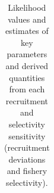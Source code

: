 \documentclass[
]{scrartcl}
\begin{document}
\newpage{}

\begin{landscape}
\begingroup
\fontsize{9.0pt}{10.8pt}\selectfont

\begin{longtable}{>{\raggedright\arraybackslash}p{\dimexpr 56.25pt -2\tabcolsep-1.5\arrayrulewidth}>{\raggedright\arraybackslash}p{\dimexpr 150.00pt -2\tabcolsep-1.5\arrayrulewidth}>{\raggedright\arraybackslash}p{\dimexpr 56.25pt -2\tabcolsep-1.5\arrayrulewidth}>{\raggedright\arraybackslash}p{\dimexpr 56.25pt -2\tabcolsep-1.5\arrayrulewidth}>{\raggedright\arraybackslash}p{\dimexpr 56.25pt -2\tabcolsep-1.5\arrayrulewidth}>{\raggedright\arraybackslash}p{\dimexpr 56.25pt -2\tabcolsep-1.5\arrayrulewidth}>{\raggedright\arraybackslash}p{\dimexpr 56.25pt -2\tabcolsep-1.5\arrayrulewidth}>{\raggedright\arraybackslash}p{\dimexpr 56.25pt -2\tabcolsep-1.5\arrayrulewidth}}

\caption{\label{tbl-sensitivities-sel-rec_2}Likelihood values and
estimates of key parameters and derived quantities from each recruitment
and selectivity sensitivity (recruitment deviations and fishery
selectivity).}

\tabularnewline


\end{longtable}
\end{landscape}
\end{document}
